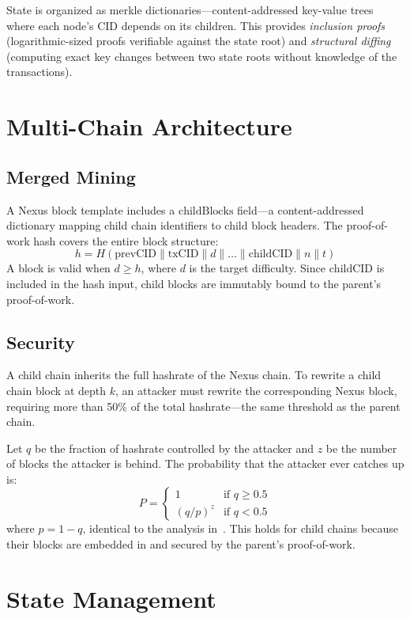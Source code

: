 \documentclass[11pt,a4paper]{article}
\begin{document}
State is organized as merkle dictionaries---content-addressed key-value trees where each node's CID depends on its children. This provides \emph{inclusion proofs} (logarithmic-sized proofs verifiable against the state root) and \emph{structural diffing} (computing exact key changes between two state roots without knowledge of the transactions).

\section{Multi-Chain Architecture}

\subsection{Merged Mining}

A Nexus block template includes a $\text{childBlocks}$ field---a content-addressed dictionary mapping child chain identifiers to child block headers. The proof-of-work hash covers the entire block structure:
\[
h = H(\text{prevCID} \| \text{txCID} \| d \| \ldots \| \text{childCID} \| n \| t)
\]
A block is valid when $d \geq h$, where $d$ is the target difficulty. Since $\text{childCID}$ is included in the hash input, child blocks are immutably bound to the parent's proof-of-work.

\subsection{Security}

A child chain inherits the full hashrate of the Nexus chain. To rewrite a child chain block at depth $k$, an attacker must rewrite the corresponding Nexus block, requiring more than 50\% of the total hashrate---the same threshold as the parent chain.

Let $q$ be the fraction of hashrate controlled by the attacker and $z$ be the number of blocks the attacker is behind. The probability that the attacker ever catches up is:
\[
P = \begin{cases}
1 & \text{if } q \geq 0.5 \\
(q/p)^z & \text{if } q < 0.5
\end{cases}
\]
where $p = 1 - q$, identical to the analysis in~\cite{nakamoto2008}. This holds for child chains because their blocks are embedded in and secured by the parent's proof-of-work.

\section{State Management}
\end{document}
